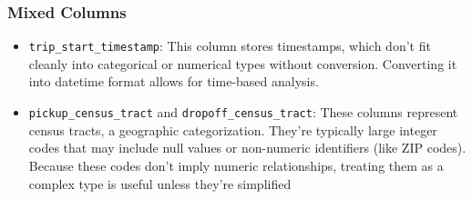     \subsubsection{Mixed Columns}
    \begin{itemize}
        \item \texttt{trip\_start\_timestamp}: This column stores timestamps, which don't fit cleanly into categorical or numerical types without conversion. Converting it into datetime format allows for time-based analysis.
        \item \texttt{pickup\_census\_tract} and \texttt{dropoff\_census\_tract}: These columns represent census tracts, a geographic categorization. They're typically large integer codes that may include null values or non-numeric identifiers (like ZIP codes). Because these codes don’t imply numeric relationships, treating them as a complex type is useful unless they’re simplified
    \end{itemize}


    
